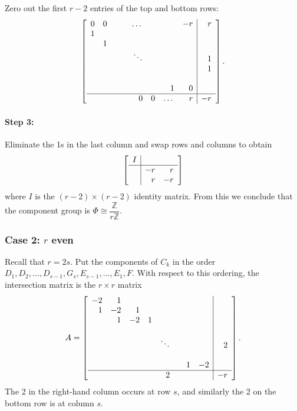 \documentclass[reqno]{amsart}
\theoremstyle{definition}
\theoremstyle{remark}
\def\Z{\mathbb{Z}}
\def\isom{\cong}
\begin{document}
Zero out the first $r-2$ entries of the top and bottom rows:
\[
\left[\begin{array}{rrrrrrrr|r}
  0 & 0 & & & \dots & & & -r & r \\
  1 & & & & & & & & \\
  & 1 & & & & & & & \\
  & & & & \ddots & & & & 1 \\
  & & & &  & & & & 1 \\
  & & & &  & & & & \\
  & & & & & & 1 & 0 & \\ \hline
  & & & & 0 & 0 & \dots & r & -r
\end{array}\right].
\]

\paragraph{Step 3:}
\label{sec:step-3-odd}

Eliminate the 1s in the last column and swap rows and columns to obtain
\[
\left[\begin{array}{c|rr}
  I & & \\ \hline
 & -r & r \\
& r & -r
\end{array}\right]
\]
where $I$ is the $(r-2) \times (r-2)$ identity matrix. From this we conclude that the component group is $\Phi \isom \dfrac{\Z}{r\Z}$.

\subsubsection{Case 2: $r$ even}
\label{sec:case-2:-r-even}

Recall that $r = 2s$. Put the components of $C_k$ in the order $D_1, D_2, \dots, D_{s-1}, G_s, E_{s-1}, \dots, E_1, F$. With respect to this ordering, the intersection matrix is the $r \times r$ matrix
\[
A = \left[\begin{array}{rrrrrrrr|r}
  -2 & 1 & & & & & & & \\
  1 & -2 & 1 & & & & & & \\
  & 1 & -2 & 1 & & & & & \\
  & & & & & & & & \\
  & & & & \ddots & & & & 2 \\
  & & & & & & & & \\
  & & & & & & 1 & -2 & \\ \hline
  & & & & 2 &  & & & -r
\end{array}\right].
\]
The 2 in the right-hand column occurs at row $s$, and similarly the 2 on the bottom row is at column $s$.
\end{document}
